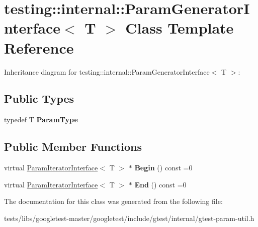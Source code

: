 \hypertarget{classtesting_1_1internal_1_1ParamGeneratorInterface}{}\section{testing\+:\+:internal\+:\+:Param\+Generator\+Interface$<$ T $>$ Class Template Reference}
\label{classtesting_1_1internal_1_1ParamGeneratorInterface}


Inheritance diagram for testing\+:\+:internal\+:\+:Param\+Generator\+Interface$<$ T $>$\+:
\subsection*{Public Types}
\begin{DoxyCompactItemize}
\item 
\mbox{\label{classtesting_1_1internal_1_1ParamGeneratorInterface_ab33d2ea424c50beaf503cb125b3cd003}} 
typedef T {\bfseries Param\+Type}
\end{DoxyCompactItemize}
\subsection*{Public Member Functions}
\begin{DoxyCompactItemize}
\item 
\mbox{\label{classtesting_1_1internal_1_1ParamGeneratorInterface_ae1de83b16fe9a53c67778a026c6a9569}} 
virtual \hyperlink{classtesting_1_1internal_1_1ParamIteratorInterface}{Param\+Iterator\+Interface}$<$ T $>$ $\ast$ {\bfseries Begin} () const =0
\item 
\mbox{\label{classtesting_1_1internal_1_1ParamGeneratorInterface_afa7211b74990e11d3fc7ad4e7113da4f}} 
virtual \hyperlink{classtesting_1_1internal_1_1ParamIteratorInterface}{Param\+Iterator\+Interface}$<$ T $>$ $\ast$ {\bfseries End} () const =0
\end{DoxyCompactItemize}


The documentation for this class was generated from the following file\+:\begin{DoxyCompactItemize}
\item 
tests/libs/googletest-\/master/googletest/include/gtest/internal/gtest-\/param-\/util.\+h\end{DoxyCompactItemize}
